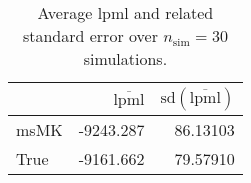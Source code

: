 \begin{table}[H]

\caption{Average lpml and related standard error over $n_{\text{sim}} = 30$ simulations.}
\centering
\begin{tabular}[t]{lrr}
\toprule
  & $\overbar{\text{lpml}}$ & $\text{sd}(\overbar{\text{lpml}})$\\
\midrule
msMK & -9243.287 & 86.13103\\
True & -9161.662 & 79.57910\\
\bottomrule
\end{tabular}
\end{table}